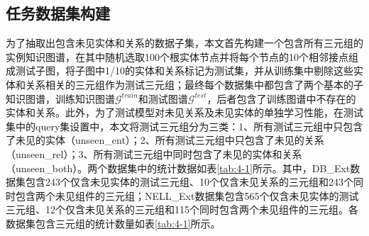 \subsection{任务数据集构建}
为了抽取出包含未见实体和关系的数据子集，本文首先构建一个包含所有三元组的实例知识图谱，在其中随机选取100个根实体节点并将每个节点的10个相邻接点组成测试子图，将子图中1/10的实体和关系标记为测试集，并从训练集中剔除这些实体和关系相关的三元组作为测试三元组；最终每个数据集中都包含了两个基本的子知识图谱，训练知识图谱\(\mathcal{G}^{train}\)和测试图谱\(\mathcal{G}^{test}\)，后者包含了训练图谱中不存在的实体和关系。此外，为了测试模型对未见关系及未见实体的单独学习性能，在测试集中的query集设置中，本文将测试三元组分为三类：1、所有测试三元组中只包含了未见的实体（unseen\_ent）；2、所有测试三元组中只包含了未见的关系（unseen\_rel）；3、所有测试三元组中同时包含了未见的实体和关系（unseen\_both）。两个数据集中的统计数据如表\ref{tab:4-1}所示。其中，DB\_Ext数据集包含243个仅含未见实体的测试三元组、10个仅含未见关系的三元组和243个同时包含两个未见组件的三元组；NELL\_Ext数据集包含565个仅含未见实体的测试三元组、12个仅含未见关系的三元组和115个同时包含两个未见组件的三元组。各数据集包含三元组的统计数量如表\ref{tab:4-1}所示。
